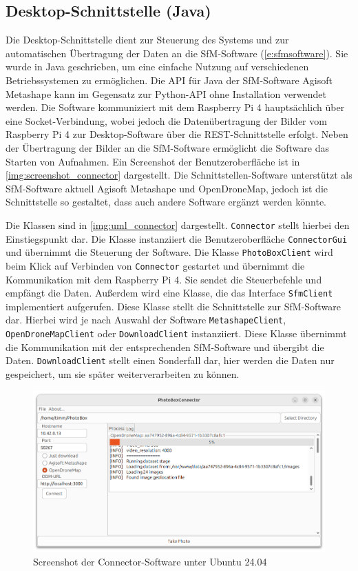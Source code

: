 \documentclass[./00PhotoBox.tex]{subfiles}
\begin{document}
\subsection{Desktop-Schnittstelle (Java)}
Die Desktop-Schnittstelle dient zur Steuerung des Systems und zur au\-to\-ma\-tischen Über\-tragung der Daten an die \Gls{SfM}-Software (\autoref{e:sfmsoftware}). Sie wurde in Java geschrieben, um eine einfache Nutzung auf verschiedenen Betriebssystemen zu ermöglichen. Die \Gls{API} für Java der \Gls{SfM}-Software Agisoft Metashape kann im Gegensatz zur Python-\Gls{API} ohne Installation verwendet werden. Die Software kommuniziert mit dem Raspberry Pi 4 hauptsächlich über eine \Gls{Socket}-Verbindung, wobei jedoch die Datenübertragung der Bilder vom Raspberry Pi 4 zur Desktop-Software über die \Gls{REST}-Schnittstelle erfolgt. Neben der Übertragung der Bilder an die \Gls{SfM}-Software ermöglicht die Software das Starten von Aufnahmen. Ein Screenshot der Benutzeroberfläche ist in \autoref{img:screenshot_connector} dargestellt. Die Schnittstellen-Software unterstützt als \Gls{SfM}-Software aktuell Agisoft Metashape und OpenDroneMap, jedoch ist die Schnittstelle so gestaltet, dass auch andere Software ergänzt werden könnte.

Die Klassen sind in \autoref{img:uml_connector} dargestellt. \texttt{Connector} stellt hierbei den Einstiegspunkt dar. Die Klasse instanziiert die Benutzeroberfläche \texttt{ConnectorGui} und übernimmt die Steuerung der Software. Die Klasse \texttt{PhotoBoxClient} wird beim Klick auf Verbinden von \texttt{Connector} gestartet und übernimmt die Kommunikation mit dem Raspberry Pi 4. Sie sendet die Steuerbefehle und empfängt die Daten. Außerdem wird eine Klasse, die das Interface \texttt{SfmClient} implementiert aufgerufen. Diese Klasse stellt die Schnittstelle zur \Gls{SfM}-Software dar. Hierbei wird je nach Auswahl der Software \texttt{MetashapeClient}, \texttt{OpenDroneMapClient} oder \texttt{DownloadClient} instanziiert. Diese Klasse übernimmt die Kommunikation mit der entsprechenden \Gls{SfM}-Software und übergibt die Daten. \texttt{DownloadClient} stellt einen Sonderfall dar, hier werden die Daten nur gespeichert, um sie später weiterverarbeiten zu können.

\begin{figure}
    \centering
    \includegraphics[width=1\textwidth]{./img/5_software/connector_screenshot.png}
    \caption{Screenshot der Connector-Software unter Ubuntu 24.04}
    \label{img:screenshot_connector}
\end{figure}
\end{document}
